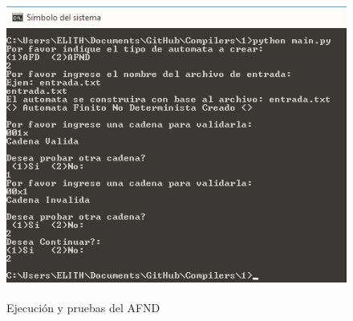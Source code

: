 	\begin{figure}[H]
		\begin{center}
			\includegraphics[width=15cm, height=10cm]{img/afnd_salida.png}
			\caption{Ejecución y pruebas del AFND}
			\label{fig:tablas13}
		\end{center}
	\end{figure}